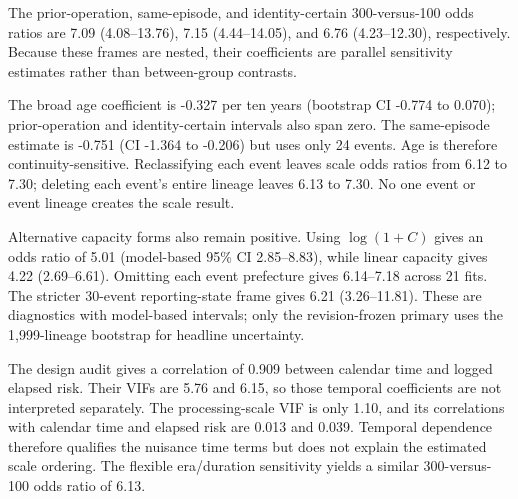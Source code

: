 \documentclass[12pt,a4paper]{article}
\begin{document}
The prior-operation, same-episode, and identity-certain 300-versus-100 odds
ratios are 7.09 (4.08--13.76), 7.15 (4.44--14.05), and 6.76 (4.23--12.30),
respectively. Because these frames are nested, their coefficients are parallel
sensitivity estimates rather than between-group contrasts.

The broad age coefficient is -0.327 per ten years (bootstrap CI -0.774 to
0.070); prior-operation and identity-certain intervals also span zero. The
same-episode estimate is -0.751 (CI -1.364 to -0.206) but uses only 24 events.
Age is therefore continuity-sensitive. Reclassifying each event leaves scale
odds ratios from 6.12 to 7.30; deleting each event's entire lineage leaves 6.13
to 7.30. No one event or event lineage creates the scale result.

Alternative capacity forms also remain positive. Using $\log(1+C)$ gives an
odds ratio of 5.01 (model-based 95\% CI 2.85--8.83), while linear capacity gives 4.22
(2.69--6.61). Omitting each event prefecture gives 6.14--7.18 across 21 fits.
The stricter 30-event reporting-state frame gives 6.21 (3.26--11.81). These are
diagnostics with model-based intervals; only the revision-frozen primary uses the
1,999-lineage bootstrap for headline uncertainty.

The design audit gives a correlation of 0.909 between calendar time and logged
elapsed risk. Their VIFs are 5.76 and 6.15, so those temporal coefficients are
not interpreted separately. The processing-scale VIF is only 1.10, and its
correlations with calendar time and elapsed risk are 0.013 and 0.039. Temporal
dependence therefore qualifies the nuisance time terms but does not explain the
estimated scale ordering. The flexible era/duration sensitivity yields a
similar 300-versus-100 odds ratio of 6.13.
\end{document}
